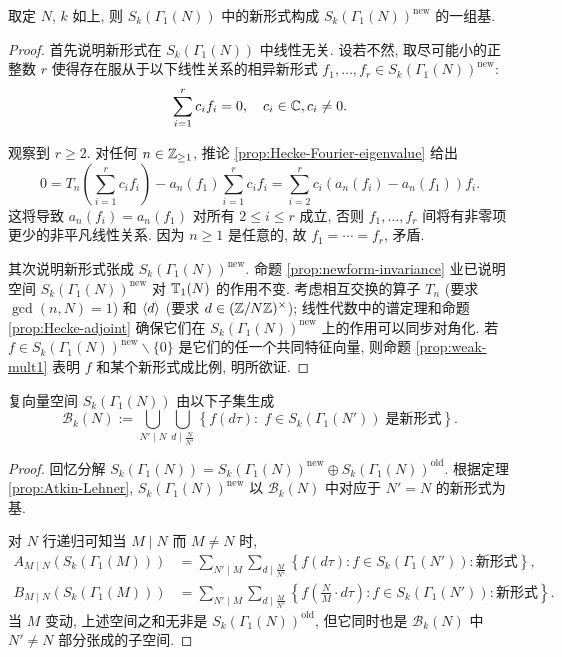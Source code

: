 \begin{theorem}\label{prop:Atkin-Lehner} 
	取定 $N$, $k$ 如上, 则 $S_k(\Gamma_1(N))$ 中的新形式构成 $S_k(\Gamma_1(N))^{\mathrm{new}}$ 的一组基.
\end{theorem}
\begin{proof}
	首先说明新形式在 $S_k(\Gamma_1(N))$ 中线性无关. 设若不然, 取尽可能小的正整数 $r$ 使得存在服从于以下线性关系的相异新形式 $f_1, \ldots, f_r \in S_k(\Gamma_1(N))^{\mathrm{new}}$:
	\[ \sum_{i=1}^r c_i f_i = 0, \quad c_i \in \mathbb{C}, c_i \neq 0. \]
	
	观察到 $r \geq 2$. 对任何 $n \in \mathbb{Z}_{\geq 1}$, 推论 \ref{prop:Hecke-Fourier-eigenvalue} 给出
	\[ 0 = T_n\left( \sum_{i=1}^r c_i f_i \right) - a_n(f_1) \sum_{i=1}^r c_i f_i = \sum_{i=2}^r c_i \left( a_n(f_i) - a_n(f_1) \right) f_i. \]
	这将导致 $a_n(f_i) = a_n(f_1)$ 对所有 $2 \leq i \leq r$ 成立, 否则 $f_1, \ldots, f_r$ 间将有非零项更少的非平凡线性关系. 因为 $n \geq 1$ 是任意的, 故 $f_1 = \cdots = f_r$, 矛盾.

	其次说明新形式张成 $S_k(\Gamma_1(N))^{\mathrm{new}}$. 命题 \ref{prop:newform-invariance} 业已说明空间 $S_k(\Gamma_1(N))^{\mathrm{new}}$ 对 $\mathbb{T}_1(N)$ 的作用不变. 考虑相互交换的算子 $T_n$ (要求 $\gcd(n,N)=1$) 和 $\left\langle d \right\rangle$ (要求 $d \in (\mathbb{Z}/N\mathbb{Z})^\times$); 线性代数中的谱定理和命题 \ref{prop:Hecke-adjoint} 确保它们在 $S_k(\Gamma_1(N))^{\mathrm{new}}$ 上的作用可以同步对角化. 若 $f \in S_k(\Gamma_1(N))^{\mathrm{new}} \smallsetminus \{0\}$ 是它们的任一个共同特征向量, 则命题 \ref{prop:weak-mult1} 表明 $f$ 和某个新形式成比例, 明所欲证.
\end{proof}

\begin{corollary}\label{prop:newform-basis}
	复向量空间 $S_k(\Gamma_1(N))$ 由以下子集生成
	\[ \mathcal{B}_k(N) := \bigcup_{N' \mid N} \bigcup_{d \mid \frac{N}{N'}} \left\{ f(d\tau): \; f \in S_k(\Gamma_1(N'))\; \text{是新形式} \right\}. \]
\end{corollary}
\begin{proof}
	回忆分解 $S_k(\Gamma_1(N)) = S_k(\Gamma_1(N))^{\mathrm{new}} \oplus S_k(\Gamma_1(N))^{\mathrm{old}}$. 根据定理 \ref{prop:Atkin-Lehner}, $S_k(\Gamma_1(N))^{\mathrm{new}}$ 以 $\mathcal{B}_k(N)$ 中对应于 $N' = N$ 的新形式为基.
	
	对 $N$ 行递归可知当 $M \mid N$ 而 $M \neq N$ 时,
	\begin{align*}
		A_{M \mid N} \left( S_k(\Gamma_1(M)) \right) & = \sum_{N' \mid M} \sum_{d \mid \frac{M}{N'}} \left\{ f(d\tau) : f \in S_k(\Gamma_1(N')): \text{新形式}  \right\}, \\
		B_{M \mid N} \left( S_k(\Gamma_1(M)) \right) & = \sum_{N' \mid M} \sum_{d \mid \frac{M}{N'}} \left\{ f\left( \frac{N}{M} \cdot d\tau \right) : f \in S_k(\Gamma_1(N')): \text{新形式}  \right\}.
	\end{align*}
	当 $M$ 变动, 上述空间之和无非是 $S_k(\Gamma_1(N))^{\mathrm{old}}$, 但它同时也是 $\mathcal{B}_k(N)$ 中 $N' \neq N$ 部分张成的子空间.
\end{proof}

